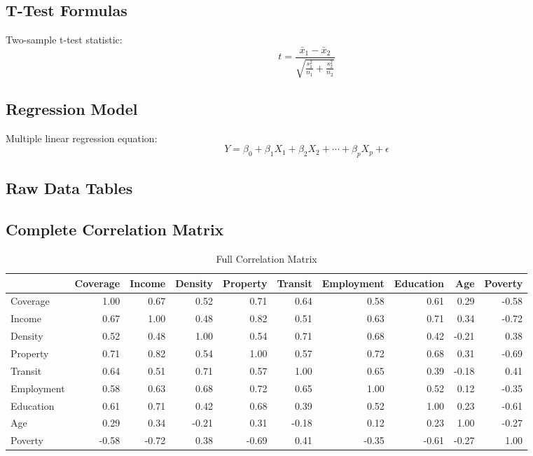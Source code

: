 \documentclass[11pt,letterpaper]{article}
\begin{document}
\subsection{T-Test Formulas}
Two-sample t-test statistic:
\[
t = \frac{\bar{x}_1 - \bar{x}_2}{\sqrt{\frac{s_1^2}{n_1} + \frac{s_2^2}{n_2}}}
\]

\subsection{Regression Model}
Multiple linear regression equation:
\[
Y = \beta_0 + \beta_1X_1 + \beta_2X_2 + \cdots + \beta_pX_p + \epsilon
\]

\subsection{Raw Data Tables}

\subsection{Complete Correlation Matrix}
\begin{table}[h]
\centering
\caption{Full Correlation Matrix}
\small
\begin{tabular}{lrrrrrrrrr}
\toprule
& Coverage & Income & Density & Property & Transit & Employment & Education & Age & Poverty \\
\midrule
Coverage & 1.00 & 0.67 & 0.52 & 0.71 & 0.64 & 0.58 & 0.61 & 0.29 & -0.58 \\
Income & 0.67 & 1.00 & 0.48 & 0.82 & 0.51 & 0.63 & 0.71 & 0.34 & -0.72 \\
Density & 0.52 & 0.48 & 1.00 & 0.54 & 0.71 & 0.68 & 0.42 & -0.21 & 0.38 \\
Property & 0.71 & 0.82 & 0.54 & 1.00 & 0.57 & 0.72 & 0.68 & 0.31 & -0.69 \\
Transit & 0.64 & 0.51 & 0.71 & 0.57 & 1.00 & 0.65 & 0.39 & -0.18 & 0.41 \\
Employment & 0.58 & 0.63 & 0.68 & 0.72 & 0.65 & 1.00 & 0.52 & 0.12 & -0.35 \\
Education & 0.61 & 0.71 & 0.42 & 0.68 & 0.39 & 0.52 & 1.00 & 0.23 & -0.61 \\
Age & 0.29 & 0.34 & -0.21 & 0.31 & -0.18 & 0.12 & 0.23 & 1.00 & -0.27 \\
Poverty & -0.58 & -0.72 & 0.38 & -0.69 & 0.41 & -0.35 & -0.61 & -0.27 & 1.00 \\
\bottomrule
\end{tabular}
\end{table}
\end{document}
